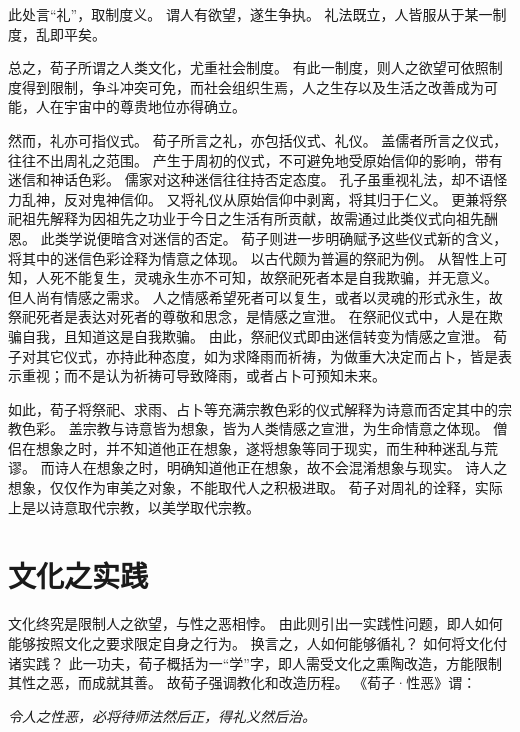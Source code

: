 \documentclass[11pt]{article}
\begin{document}
此处言“礼”，取制度义。
谓人有欲望，遂生争执。
礼法既立，人皆服从于某一制度，乱即平矣。

\par

总之，荀子所谓之人类文化，尤重社会制度。
有此一制度，则人之欲望可依照制度得到限制，争斗冲突可免，而社会组织生焉，人之生存以及生活之改善成为可能，人在宇宙中的尊贵地位亦得确立。

\par

然而，礼亦可指仪式。
荀子所言之礼，亦包括仪式、礼仪。
盖儒者所言之仪式，往往不出周礼之范围。
产生于周初的仪式，不可避免地受原始信仰的影响，带有迷信和神话色彩。
儒家对这种迷信往往持否定态度。
孔子虽重视礼法，却不语怪力乱神，反对鬼神信仰。
又将礼仪从原始信仰中剥离，将其归于仁义。
更兼将祭祀祖先解释为因祖先之功业于今日之生活有所贡献，故需通过此类仪式向祖先酬恩。
此类学说便暗含对迷信的否定。
荀子则进一步明确赋予这些仪式新的含义，将其中的迷信色彩诠释为情意之体现。
以古代颇为普遍的祭祀为例。
从智性上可知，人死不能复生，灵魂永生亦不可知，故祭祀死者本是自我欺骗，并无意义。
但人尚有情感之需求。
人之情感希望死者可以复生，或者以灵魂的形式永生，故祭祀死者是表达对死者的尊敬和思念，是情感之宣泄。
在祭祀仪式中，人是在欺骗自我，且知道这是自我欺骗。
由此，祭祀仪式即由迷信转变为情感之宣泄。
荀子对其它仪式，亦持此种态度，如为求降雨而祈祷，为做重大决定而占卜，皆是表示重视；而不是认为祈祷可导致降雨，或者占卜可预知未来。

\par

如此，荀子将祭祀、求雨、占卜等充满宗教色彩的仪式解释为诗意而否定其中的宗教色彩。
盖宗教与诗意皆为想象，皆为人类情感之宣泄，为生命情意之体现。
僧侣在想象之时，并不知道他正在想象，遂将想象等同于现实，而生种种迷乱与荒谬。
而诗人在想象之时，明确知道他正在想象，故不会混淆想象与现实。
诗人之想象，仅仅作为审美之对象，不能取代人之积极进取。
荀子对周礼的诠释，实际上是以诗意取代宗教，以美学取代宗教。

\section{文化之实践}
文化终究是限制人之欲望，与性之恶相悖。
由此则引出一实践性问题，即人如何能够按照文化之要求限定自身之行为。
换言之，人如何能够循礼？
如何将文化付诸实践？
此一功夫，荀子概括为一“学”字，即人需受文化之熏陶改造，方能限制其性之恶，而成就其善。
故荀子强调教化和改造历程。
《荀子·性恶》谓：

\textit{令人之性恶，必将待师法然后正，得礼义然后治。}

\par
\end{document}
